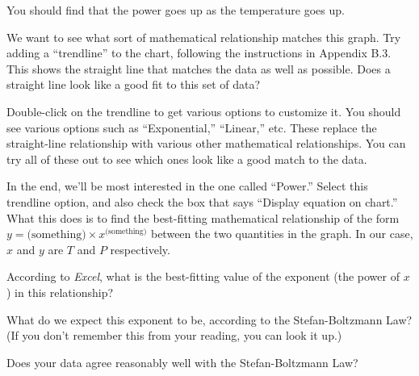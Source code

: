 You should find that the power goes up as the temperature goes up.

We want to see what sort of mathematical relationship matches this graph. 
Try adding a ``trendline'' to the chart, following the instructions
in Appendix B.3.
This shows the straight line
that matches the data as well as possible. Does a straight line look
like a good fit to this set of data?

\answerspace{1in}

Double-click on the trendline to get various options to customize it.
You should see various options such as ``Exponential,'' ``Linear,'' etc.
These replace the straight-line relationship with various other 
mathematical relationships. You can try all of these out to see
which ones look like a good match to the data.

In the end, we'll be most interested in the one called ``Power.'' Select
this trendline option, and also check the box that says ``Display
equation on chart.'' What this does is to find the best-fitting mathematical
relationship of the form $y=\mbox{(something)}\times x^{\mbox{(something)}}$
between the two quantities in the graph. In our case, $x$ and $y$
are $T$ and $P$ respectively.

According to \textit{Excel}, what is the best-fitting value
of the exponent (the power of $x$) in this relationship?

\answerspace{1in}

What do we expect this exponent to be, according to the Stefan-Boltzmann
Law? (If you don't remember this from your reading, you can look it up.)

\answerspace{1in}

Does your data agree reasonably well with the Stefan-Boltzmann Law?


